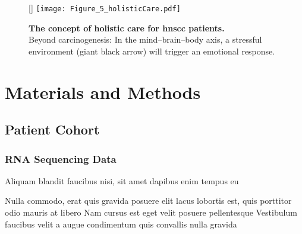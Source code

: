 \documentclass[
paper=landscape,
paper=160mm:90mm, %
fontsize=11pt, %
pagesize, %
parskip=half-, %
]{scrartcl} %
\newcommand{\bcaption}[2]{\caption{\textbf{#1} #2}}
\theoremstyle{mythmstyle} %
\begin{document}
\clearpage


\begin{figure}[hbt!]
\centering
{}[\FBwidth]
{\texttt{[image: Figure\_5\_holisticCare.pdf]}}
{\bcaption{The concept of holistic care for \acrshort{hnscc} patients.}
{\\Beyond carcinogenesis: In the mind--brain--body axis, a stressful environment (giant \textcolor{black}{black} arrow) will trigger an emotional response.}}
\end{figure}

\clearpage

\section{Materials and Methods} %
\subsection{Patient Cohort} 
\subsubsection{RNA Sequencing Data} 

\begin{outline}

\1 Aliquam blandit faucibus nisi, sit amet dapibus enim tempus eu

\2 Nulla commodo, erat quis gravida posuere
\1 elit lacus lobortis est, quis porttitor odio mauris at libero
\1 Nam cursus est eget velit posuere pellentesque
\1 Vestibulum faucibus velit a augue condimentum quis convallis nulla gravida

\end{outline}
\end{document}
